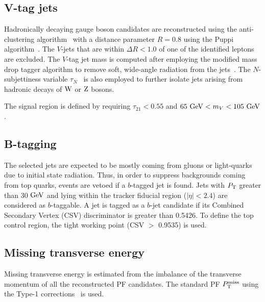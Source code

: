 \subsection{V-tag jets}
Hadronically decaying gauge boson candidates are reconstructed using the anti-\kt clustering algorithm~\cite{antikt} with a distance parameter $R=0.8$ using the Puppi algorithm~\cite{Bertolini:2014bba}. The $V$-jets that are within $\Delta R < 1.0$ of one of the identified leptons are excluded. The $V$-tag jet mass is computed after employing the modified mass drop tagger algorithm to remove soft, wide-angle radiation from the jets~\cite{Dasgupta:2013ihk,Larkoski:2014wba}. The $N$-subjettiness variable $\tau_N$~\cite{Thaler:2010tr} is also employed to further isolate jets arising from hadronic decays of $\mathrm{W}$ or $\mathrm{Z}$ bosons.   

The signal region is defined by requiring $\tau_{21}<0.55$ and $ 65 ~\mathrm{GeV} < m_{V} < 105 ~\mathrm{GeV}$.

\subsection{B-tagging}

The selected jets are expected to be mostly coming from gluons or light-quarks
due to initial state radiation. Thus, in order to suppress backgrounds coming from top quarks, events are vetoed if a $b$-tagged jet is found.
Jets with $P_\mathrm{T}$ greater than 30 $\mathrm{GeV}$ and lying within the tracker fiducial region ($\left|\eta\right|<2.4$) are considered as $b$-taggable.
A jet is tagged as a $b$-jet candidate if its Combined Secondary Vertex (CSV) discriminator is greater than 0.5426. To define the top control region, the tight working point (CSV $>$ 0.9535) is used.


\subsection{Missing transverse energy}
Missing transverse energy is estimated from the imbalance of the transverse momentum of all the reconstructed PF candidates. The standard PF $P_\mathrm{T}^{\mathrm{miss}}$ using the Type-1 corrections~\cite{cms-met-analysis-twiki} is used. 

